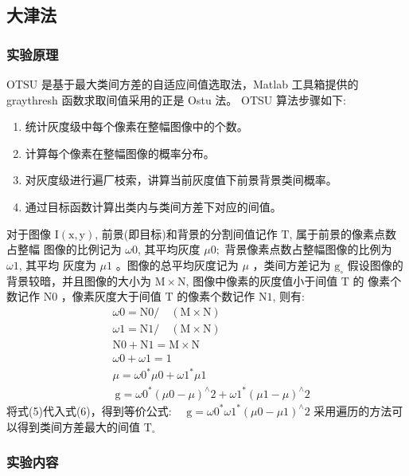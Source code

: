 \documentclass{ctexart}
\begin{document}
\subsection{\hei 大津法}
\subsubsection{\hei 实验原理}
$\mathrm{OTSU}$ 是基于最大类间方差的自适应间值选取法，Matlab 工具箱提供的 graythresh 函数求取间值采用的正是 Ostu 法。 $\mathrm{OTSU}$ 算法步骤如下:
\begin{enumerate}
    \item 统计灰度级中每个像素在整幅图像中的个数。
    \item 计算每个像素在整幅图像的概率分布。
    \item 对灰度级进行遍厂枝索，讲算当前灰度值下前景背景类间概率。
    \item 通过目标函数计算出类内与类间方差下对应的间值。
\end{enumerate} 
对于图像 $\mathrm{I}(\mathrm{x}, \mathrm{y})$, 前景(即目标)和背景的分割间值记作 $\mathrm{T}$, 属于前景的像素点数占整幅
图像的比例记为 $\omega 0$, 其平均灰度 $\mu 0 ;$ 背景像素点数占整幅图像的比例为 $\omega 1$, 其平均
灰度为 $\mu 1$ 。图像的总平均灰度记为 $\mu$ ，类间方差记为 $\mathrm{g}_{\circ}$
假设图像的背景较暗，并且图像的大小为 $\mathrm{M} \times \mathrm{N}$, 图像中像素的灰度值小于间值 $\mathrm{T}$ 的
像素个数记作 $\mathrm{N} 0$ ，像素灰度大于间值 $\mathrm{T}$ 的像素个数记作 $\mathrm{N} 1$, 则有:
$$
\begin{aligned}
&\omega 0=\mathrm{N} 0 / \quad(\mathrm{M} \times \mathrm{N}) \\
&\omega 1=\mathrm{N} 1 / \quad(\mathrm{M} \times \mathrm{N}) \\
&\mathrm{N} 0+\mathrm{N} 1=\mathrm{M} \times \mathrm{N} \\
&\omega 0+\omega 1=1 \\
&\mu=\omega 0^{*} \mu 0+\omega 1^{*} \mu 1 \\
&\mathrm{~g}=\omega 0^{*}(\mu 0-\mu)^{\wedge} 2+\omega 1^{*}(\mu 1-\mu)^{\wedge} 2
\end{aligned}
$$
将式(5)代入式(6)，得到等价公式: $\quad \mathrm{g}=\omega 0^{*} \omega 1^{*}(\mu 0-\mu 1)^{\wedge} 2$
采用遍历的方法可以得到类间方差最大的间值 $\mathrm{T}_{\circ}$
\subsubsection{\hei 实验内容}
\end{document}
